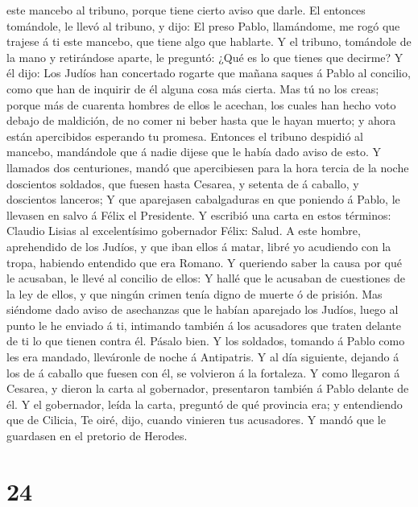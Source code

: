 este mancebo al tribuno, porque tiene cierto aviso que darle.
 El entonces tomándole, le llevó al tribuno, y dijo: El
preso Pablo, llamándome, me rogó que trajese á ti este mancebo, que
tiene algo que hablarte.  Y el tribuno, tomándole de la
mano y retirándose aparte, le preguntó: ¿Qué es lo que tienes que
decirme?  Y él dijo: Los Judíos han concertado rogarte que
mañana saques á Pablo al concilio, como que han de inquirir de él alguna
cosa más cierta.  Mas tú no los creas; porque más de
cuarenta hombres de ellos le acechan, los cuales han hecho voto debajo
de maldición, de no comer ni beber hasta que le hayan muerto; y ahora
están apercibidos esperando tu promesa.  Entonces el
tribuno despidió al mancebo, mandándole que á nadie dijese que le había
dado aviso de esto.  Y llamados dos centuriones, mandó que
apercibiesen para la hora tercia de la noche doscientos soldados, que
fuesen hasta Cesarea, y setenta de á caballo, y doscientos lanceros;
 Y que aparejasen cabalgaduras en que poniendo á Pablo, le
llevasen en salvo á Félix el Presidente.  Y escribió una
carta en estos términos:  Claudio Lisias al excelentísimo
gobernador Félix: Salud.  A este hombre, aprehendido de los
Judíos, y que iban ellos á matar, libré yo acudiendo con la tropa,
habiendo entendido que era Romano.  Y queriendo saber la
causa por qué le acusaban, le llevé al concilio de ellos: 
Y hallé que le acusaban de cuestiones de la ley de ellos, y que ningún
crimen tenía digno de muerte ó de prisión.  Mas siéndome
dado aviso de asechanzas que le habían aparejado los Judíos, luego al
punto le he enviado á ti, intimando también á los acusadores que traten
delante de ti lo que tienen contra él. Pásalo bien.  Y los
soldados, tomando á Pablo como les era mandado, lleváronle de noche á
Antipatris.  Y al día siguiente, dejando á los de á caballo
que fuesen con él, se volvieron á la fortaleza.  Y como
llegaron á Cesarea, y dieron la carta al gobernador, presentaron también
á Pablo delante de él.  Y el gobernador, leída la carta,
preguntó de qué provincia era; y entendiendo que de Cilicia,
 Te oiré, dijo, cuando vinieren tus acusadores. Y mandó que
le guardasen en el pretorio de Herodes.

\hypertarget{section-23}{%
\section{24}\label{section-23}}

